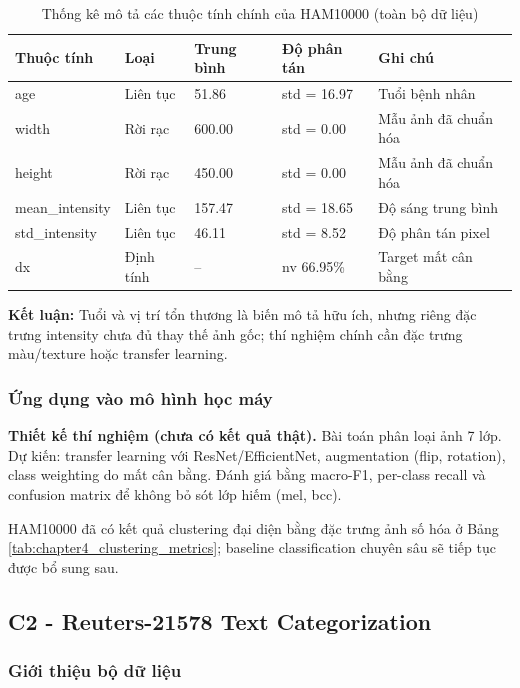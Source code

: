 \begin{table}[H]
\centering
\caption{Thống kê mô tả các thuộc tính chính của HAM10000 (toàn bộ dữ liệu)}
\label{tab:ham_descriptive_stats}
\small
\begin{tabular}{lllll}
\toprule
Thuộc tính & Loại & Trung bình & Độ phân tán & Ghi chú \\
\midrule
age & Liên tục & 51.86 & std = 16.97 & Tuổi bệnh nhân \\
width & Rời rạc & 600.00 & std = 0.00 & Mẫu ảnh đã chuẩn hóa \\
height & Rời rạc & 450.00 & std = 0.00 & Mẫu ảnh đã chuẩn hóa \\
mean\_intensity & Liên tục & 157.47 & std = 18.65 & Độ sáng trung bình \\
std\_intensity & Liên tục & 46.11 & std = 8.52 & Độ phân tán pixel \\
dx & Định tính & -- & nv 66.95\% & Target mất cân bằng \\
\bottomrule
\end{tabular}
\end{table}

\textbf{Kết luận:} Tuổi và vị trí tổn thương là biến mô tả hữu ích, nhưng riêng đặc trưng intensity chưa đủ thay thế ảnh gốc; thí nghiệm chính cần đặc trưng màu/texture hoặc transfer learning.

\subsubsection{Ứng dụng vào mô hình học máy}

\textbf{Thiết kế thí nghiệm (chưa có kết quả thật).} Bài toán phân loại ảnh 7 lớp. Dự kiến: transfer learning với ResNet/EfficientNet, augmentation (flip, rotation), class weighting do mất cân bằng. Đánh giá bằng macro-F1, per-class recall và confusion matrix để không bỏ sót lớp hiếm (mel, bcc).

HAM10000 đã có kết quả clustering đại diện bằng đặc trưng ảnh số hóa ở Bảng \ref{tab:chapter4_clustering_metrics}; baseline classification chuyên sâu sẽ tiếp tục được bổ sung sau.

\subsection{C2 - Reuters-21578 Text Categorization}

\subsubsection{Giới thiệu bộ dữ liệu}

